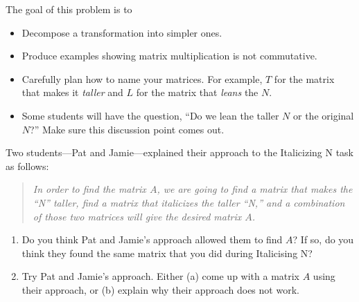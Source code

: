 \documentclass{problemset}
\begin{document}
\begin{iola}
\begin{annotation}
\begin{goals}
			The goal of this problem is to
			\begin{itemize}
				\item Decompose a transformation into simpler ones.
				\item Produce examples showing matrix multiplication is not commutative.
			\end{itemize}
		\end{goals}

		\begin{notes}
			\begin{itemize}
				\item Carefully plan how to name your matrices. For example, $T$ for 
					the matrix that makes it \emph{taller} and $L$ for the matrix
					that \emph{leans} the $N$.
				\item Some students will have the question, ``Do we lean the taller $N$ or the original $N$?''
					Make sure this discussion point comes out.
					
			\end{itemize}
		\end{notes}
	\end{annotation}

Two students---Pat and Jamie---explained their approach to the Italicizing N task as follows:
\begin{quote}\itshape
	In order to find the matrix $A$, we are going to find a matrix that makes the ``N'' taller,
	find a matrix that italicizes the taller ``N,'' and a combination of those two matrices
	will give the desired matrix $A$.
\end{quote}

\begin{enumerate}
	\item Do you think Pat and Jamie's approach allowed them to find $A$?  If so, do
		you think they found the same matrix that you did during Italicising N?
	\item Try Pat and Jamie's approach.  Either (a) come up with a matrix $A$ using
		their approach, or (b) explain why their approach does not work.
\end{enumerate}

\end{iola}
\end{document}
